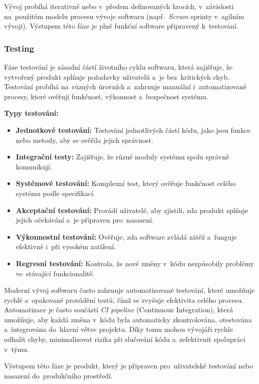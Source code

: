 \documentclass[male,czech,api_bc]{kitheses}
\begin{document}
Vývoj probíhá iterativně nebo v~předem definovaných krocích, v~závislosti na~použitém modelu procesu vývoje softwaru (např.~\textit{Scrum} sprinty v~agilním vývoji). Výstupem této fáze je plně funkční software připravený k~testování.

\subsubsection{Testing}

Fáze testování je zásadní částí životního cyklu softwaru, která zajišťuje, že vytvořený produkt splňuje požadavky uživatelů a~je bez~kritických chyb. Testování probíhá na~různých úrovních a~zahrnuje manuální i~automatizované procesy, které ověřují funkčnost, výkonnost a~bezpečnost systému.

\textbf{Typy testování:}
\begin{itemize}
	\item \textbf{Jednotkové testování:} Testování jednotlivých částí kódu, jako jsou funkce nebo metody, aby se ověřila jejich správnost.
	\item \textbf{Integrační testy:} Zajišťuje, že různé moduly systému spolu správně komunikují.
	\item \textbf{Systémové testování:} Komplexní test, který ověřuje funkčnost celého systému podle specifikací.
	\item \textbf{Akceptační testování:} Provádí uživatelé, aby zjistili, zda produkt splňuje jejich očekávání a~je připraven pro~nasazení.
	\item \textbf{Výkonnostní testování:} Ověřuje, zda software zvládá zátěž a~funguje efektivně i~při vysokém zatížení.
	\item \textbf{Regresní testování:} Kontrola, že nové změny v~kódu nezpůsobily problémy ve~stávající funkcionalitě.
\end{itemize}

Moderní vývoj softwaru často zahrnuje automatizované testování, které umožňuje rychlé a~opakované provádění testů, čímž se zvyšuje efektivita celého procesu. Automatizace je často součástí \textit{CI pipeline} (Continuous Integration), která umožňuje, aby každá změna v~kódu byla automaticky zkontrolována, otestována a~integrována do~hlavní větve projektu. Díky tomu mohou vývojáři rychle odhalit chyby, minimalizovat rizika při slučování kódu a~zefektivnit spolupráci v~týmu.

Výstupem této fáze je produkt, který je připraven pro~uživatelské testování nebo nasazení do~produkčního prostředí.
\end{document}
